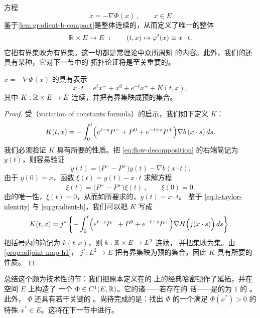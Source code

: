 \trGradient{}方程
\[
\dot{x}=-\nabla\Phi(x)\ ,\qquad x\in E
\]
鉴于\cref{lem:gradient-b-compact}是整体\trLipschitz{}连续的，从而定义了唯一的整体%
\trFlow
\[
\mathbb{R}\times E\to E\ :\qquad(t,x)\mapsto\varphi^{t}(x)\equiv x\cdot t,
\]
它把有界集映为有界集。这一切都是常\trDifferentialEquation{}理论中众所周知%
的内容。此外，我们的\trFlow{}还具有某种\trCompactness，它对下一节中的%
拓扑论证将是至关重要的。

\begin{lemma}\label{lem:gradient-flow-representation}
$\dot{x}=-\nabla\Phi(x)$ 的\trFlow{}具有表示
\begin{equation}\label{eq:flow-decomposition}
x\cdot t=e^{t}x^{-}+x^{0}+e^{-t}x^{+}+K(t,x),
\end{equation}
其中 $K:\mathbb{R}\times E\to E$ 连续，并把有界集映成预\trCompact{}的集合。
\end{lemma}

\begin{proof}
受\textbf{\trVariationOfConstantsFormula}（variation of constants formula）的启示，我们如下定义 $K$：
\[
K(t,x)=-\int_{0}^{t}\Bigl(e^{t-s}P^{-}+P^{0}+e^{-t+s}P^{+}\Bigr)\nabla b\,%
(x\cdot s)\,ds.
\]
我们必须验证 $K$ 具有所要的性质。把 \eqref{eq:flow-decomposition} 的右端简记为%
$y(t)$，则容易验证
\[
\dot{y}(t)=\bigl(P^{-}-P^{+}\bigr)y(t)-\nabla b(x\cdot t).
\]
由于 $y(0)=x$，函数 $\xi(t)=y(t)-x\cdot t$ 求解\trLinear{}方程
\[
\dot{\xi}(t)=\bigl(P^{-}-P^{+}\bigr)\xi(t)\ ,\qquad\xi(0)=0.
\]
由\trInitialValueProblem{}的唯一性，$\xi(t)=0$，从而如所要求的，$y(t)=x\cdot t$。%
鉴于 \eqref{eq:h-taylor-identity} 与 \eqref{eq:gradient-b}，我们可以把 $K$ 写成
\[
K(t,x)=j^{*}\left\{-\int_{0}^{t}\Bigl(e^{t-s}P^{-}+P^{0}+e^{-t+s}P^{+}\Bigr)%
\nabla H\Bigl(j(x\cdot s)\Bigr)\,ds\right\}.
\]
把括号内的\trMapping{}简记为 $k(t,x)$，则 $k:\mathbb{R}\times E\to L^{2}$ 连续，%
并把\trBounded{}集映为\trBounded{}集。由\cref{prop:adjoint-map-h1}，\trMapping{} $j^{*}:L^{2}\to E$%
把有界集映为预\trCompact{}的集合，因此 $K$ 具有所要的性质。
\end{proof}

总结这个颇为技术性的节：我们把原本定义在\trSmooth{}\trLoop{}的\trLoopSpace{}%
上的经典哈密顿\trFunctional{}作了延拓，并在\trHilbert{}空间 $E$ 上构造了%
一个\trFunctional{} $\Phi\in C^{1}(E,\mathbb{R})$。它的诸\trCriticalPoint——若存在的%
话——是\trHamiltonianEquation{}的\trPeriodic{}为 $1$ 的%
\trSmooth\trPeriodicSolution。此外，\trFunctional{} $\Phi$ 还具有若干关键的%
\trCompactness。尚待完成的是：找出 $\Phi$ 的一个满足 $\Phi(x^{*})>0$ 的%
特殊\trCriticalPoint{} $x^{*}\in E$。这将在下一节中进行。
